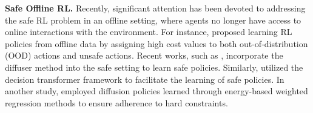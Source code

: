 \textbf{Safe Offline RL.} Recently, significant attention has been devoted to addressing the safe RL problem in an offline setting, where agents no longer have access to online interactions with the environment. For instance, \citet{xu2022constraints} proposed learning RL policies from offline data by assigning high cost values to both out-of-distribution (OOD) actions and unsafe actions. Recent works, such as \citet{lin2023safe}, incorporate the diffuser method \citep{janner2022planning} into the safe setting to learn safe policies. Similarly, \citet{liu2023constrained} utilized the decision transformer framework \citep{chen2021decision} to facilitate the learning of safe policies. In another study, \citet{zheng2024safe} employed diffusion policies learned through energy-based weighted regression methods \citep{lu2023contrastive} to ensure adherence to hard constraints.